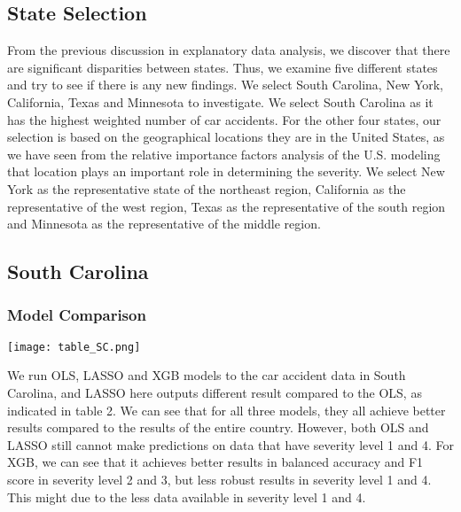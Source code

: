 \documentclass[twocolumn]{article}
\begin{document}
\subsection{State Selection}
From the previous discussion in explanatory data analysis, we discover that there are significant disparities between states. Thus, we examine five different states and try to see if there is any new findings. We select South Carolina, New York, California, Texas and Minnesota to investigate. We select South Carolina as it has the highest weighted number of car accidents. For the other four states, our selection is based on the geographical locations they are in the United States, as we have seen from the relative importance factors analysis of the U.S. modeling that location plays an important role in determining the severity. We select New York as the representative state of the northeast region, California as the representative of the west region, Texas as the representative of the south region and Minnesota as the representative of the middle region. 

\subsection{South Carolina}
\subsubsection{Model Comparison}
\begin{table}[h]
    \centering
    \texttt{[image: table\_SC.png]}
    \caption{}
\end{table}
We run OLS, LASSO and XGB models to the car accident data in South Carolina, and LASSO here outputs different result compared to the OLS, as indicated in table 2. We can see that for all three models, they all achieve better results compared to the results of the entire country. However, both OLS and LASSO still cannot make predictions on data that have severity level 1 and 4. For XGB, we can see that it achieves better results in balanced accuracy and F1 score in severity level 2 and 3, but less robust results in severity level 1 and 4. This might due to the less data available in severity level 1 and 4. 
\end{document}
